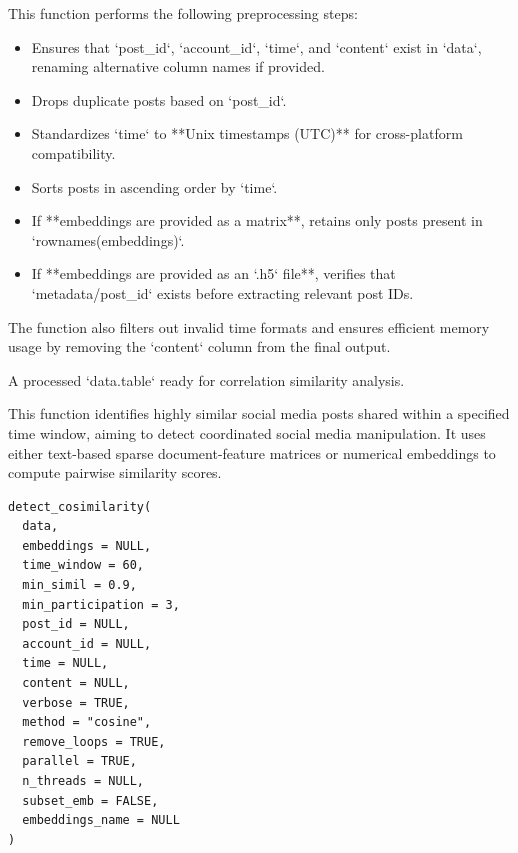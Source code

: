 \documentclass[a4paper]{book}
\begin{document}
\begin{Details}
This function performs the following preprocessing steps:
\begin{itemize}

\item{} Ensures that `post\_id`, `account\_id`, `time`, and `content` exist in `data`,
renaming alternative column names if provided.
\item{} Drops duplicate posts based on `post\_id`.
\item{} Standardizes `time` to **Unix timestamps (UTC)** for cross-platform compatibility.
\item{} Sorts posts in ascending order by `time`.
\item{} If **embeddings are provided as a matrix**, retains only posts present in `rownames(embeddings)`.
\item{} If **embeddings are provided as an `.h5` file**, verifies that `metadata/post\_id` exists
before extracting relevant post IDs.

\end{itemize}


The function also filters out invalid time formats and ensures efficient memory usage by removing the `content` column
from the final output.
\end{Details}
%
\begin{Value}
A processed `data.table` ready for correlation similarity analysis.
\end{Value}
%
\begin{Description}
This function identifies highly similar social media posts shared within a specified time window,
aiming to detect coordinated social media manipulation. It uses either text-based sparse document-feature matrices
or numerical embeddings to compute pairwise similarity scores.
\end{Description}
%
\begin{Usage}
\begin{verbatim}
detect_cosimilarity(
  data,
  embeddings = NULL,
  time_window = 60,
  min_simil = 0.9,
  min_participation = 3,
  post_id = NULL,
  account_id = NULL,
  time = NULL,
  content = NULL,
  verbose = TRUE,
  method = "cosine",
  remove_loops = TRUE,
  parallel = TRUE,
  n_threads = NULL,
  subset_emb = FALSE,
  embeddings_name = NULL
)
\end{verbatim}
\end{Usage}
%
\end{document}
